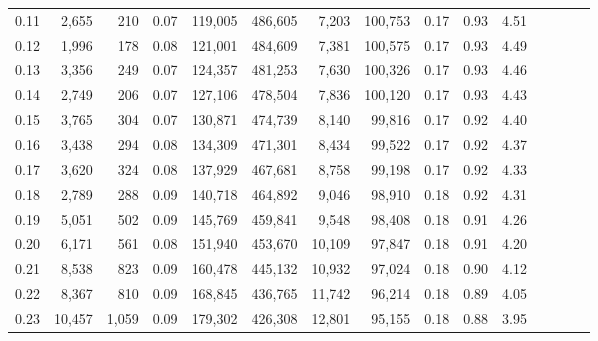 \begin{tabular}{rrrcrrrrrrrrrrr}
0.11 &   2,655 &     210 &                                       0.07 &  119,005 &  486,605 &    7,203 &  100,753 &  0.17 &  0.93 &                         4.51 \\
0.12 &   1,996 &     178 &                                       0.08 &  121,001 &  484,609 &    7,381 &  100,575 &  0.17 &  0.93 &                         4.49 \\
0.13 &   3,356 &     249 &                                       0.07 &  124,357 &  481,253 &    7,630 &  100,326 &  0.17 &  0.93 &                         4.46 \\
0.14 &   2,749 &     206 &                                       0.07 &  127,106 &  478,504 &    7,836 &  100,120 &  0.17 &  0.93 &                         4.43 \\
0.15 &   3,765 &     304 &                                       0.07 &  130,871 &  474,739 &    8,140 &   99,816 &  0.17 &  0.92 &                         4.40 \\
0.16 &   3,438 &     294 &                                       0.08 &  134,309 &  471,301 &    8,434 &   99,522 &  0.17 &  0.92 &                         4.37 \\
0.17 &   3,620 &     324 &                                       0.08 &  137,929 &  467,681 &    8,758 &   99,198 &  0.17 &  0.92 &                         4.33 \\
0.18 &   2,789 &     288 &                                       0.09 &  140,718 &  464,892 &    9,046 &   98,910 &  0.18 &  0.92 &                         4.31 \\
0.19 &   5,051 &     502 &                                       0.09 &  145,769 &  459,841 &    9,548 &   98,408 &  0.18 &  0.91 &                         4.26 \\
0.20 &   6,171 &     561 &                                       0.08 &  151,940 &  453,670 &   10,109 &   97,847 &  0.18 &  0.91 &                         4.20 \\
0.21 &   8,538 &     823 &                                       0.09 &  160,478 &  445,132 &   10,932 &   97,024 &  0.18 &  0.90 &                         4.12 \\
0.22 &   8,367 &     810 &                                       0.09 &  168,845 &  436,765 &   11,742 &   96,214 &  0.18 &  0.89 &                         4.05 \\
0.23 &  10,457 &   1,059 &                                       0.09 &  179,302 &  426,308 &   12,801 &   95,155 &  0.18 &  0.88 &                         3.95 \\

\end{tabular}
